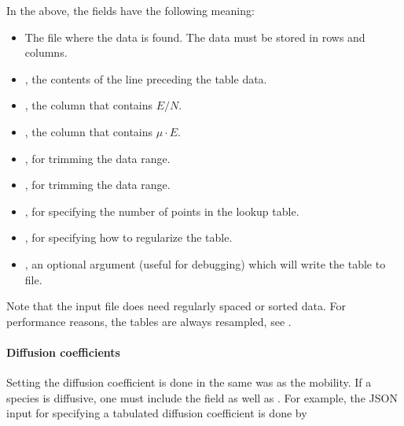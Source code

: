 \documentclass[letterpaper,10pt,english]{sphinxmanual}
\begin{document}
\sphinxAtStartPar
In the above, the fields have the following meaning:
\begin{itemize}
\item {} 
\sphinxAtStartPar
{} The file where the data is found.
The data must be stored in rows and columns.

\item {} 
\sphinxAtStartPar
{}, the contents of the line preceding the table data.

\item {} 
\sphinxAtStartPar
{}, the column that contains \(E/N\).

\item {} 
\sphinxAtStartPar
{}, the column that contains \(\mu\cdot E\).

\item {} 
\sphinxAtStartPar
{}, for trimming the data range.

\item {} 
\sphinxAtStartPar
{}, for trimming the data range.

\item {} 
\sphinxAtStartPar
{}, for specifying the number of points in the lookup table.

\item {} 
\sphinxAtStartPar
{}, for specifying how to regularize the table.

\item {} 
\sphinxAtStartPar
{}, an optional argument (useful for debugging) which will write the table to file.

\end{itemize}

\sphinxAtStartPar
Note that the input file does  need regularly spaced or sorted data.
For performance reasons, the tables are always resampled, see {\hyperref[\detokenize{Utilities/LookupTable:chap-lookuptable}]{}}.


\paragraph{Diffusion coefficients}
\label{\detokenize{Applications/CdrPlasmaModel:diffusion-coefficients}}
\sphinxAtStartPar
Setting the diffusion coefficient is done  in the same was as the mobility.
If a species is diffusive, one must include the field  as well as .
For example, the JSON input for specifying a tabulated diffusion coefficient is done by
\end{document}
